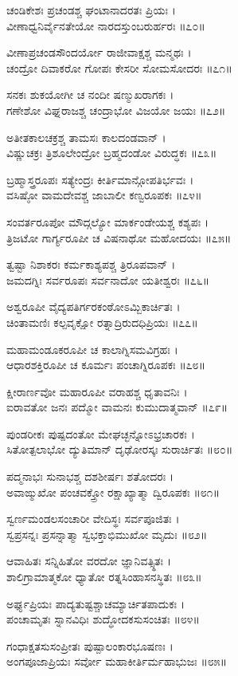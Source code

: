 ಚಂಡಿಕೇಶಃ ಪ್ರಚಂಡಶ್ಚ ಘಂಟಾನಾದರತಃ ಪ್ರಿಯಃ ।\\
ವೀಣಾಧ್ವನಿರ್ವೈನತೇಯೋ ನಾರದಸ್ತುಂಬರುರ್ಹರಃ ॥೭೦॥

ವೀಣಾಪ್ರಚಂಡಸೌಂದರ್ಯೋ ರಾಜೀವಾಕ್ಷಶ್ಚ ಮನ್ಮಥಃ ।\\
ಚಂದ್ರೋ ದಿವಾಕರೋ ಗೋಪಃ ಕೇಸರೀ ಸೋಮಸೋದರಃ ॥೭೧॥

ಸನಕಃ ಶುಕಯೋಗೀ ಚ ನಂದೀ ಷಣ್ಮುಖರಾಗಕಃ ।\\
ಗಣೇಶೋ ವಿಘ್ನರಾಜಶ್ಚ ಚಂದ್ರಾಭೋ ವಿಜಯೋ ಜಯಃ ॥೭೨॥

ಅತೀತಕಾಲಚಕ್ರಶ್ಚ ತಾಮಸಃ ಕಾಲದಂಡವಾನ್ ।\\
ವಿಷ್ಣುಚಕ್ರಃ ತ್ರಿಶೂಲೇಂದ್ರೋ ಬ್ರಹ್ಮದಂಡೋ ವಿರುದ್ಧಕಃ ॥೭೩॥

ಬ್ರಹ್ಮಾಸ್ತ್ರರೂಪಃ ಸತ್ಯೇಂದ್ರಃ ಕೀರ್ತಿಮಾನ್ಗೋಪತಿರ್ಭವಃ ।\\
ವಸಿಷ್ಠೋ ವಾಮದೇವಶ್ಚ ಜಾಬಾಲೀ ಕಣ್ವರೂಪಕಃ ॥೭೪॥

ಸಂವರ್ತರೂಪೋ ಮೌದ್ಗಲ್ಯೋ ಮಾರ್ಕಂಡೇಯಶ್ಚ ಕಶ್ಯಪಃ ।\\
ತ್ರಿಜಟೋ ಗಾರ್ಗ್ಯರೂಪೀ ಚ ವಿಷನಾಥೋ ಮಹೋದಯಃ ॥೭೫॥

ತ್ವಷ್ಟಾ ನಿಶಾಕರಃ ಕರ್ಮಕಾಶ್ಯಪಶ್ಚ ತ್ರಿರೂಪವಾನ್ ।\\
ಜಮದಗ್ನಿಃ ಸರ್ವರೂಪಃ ಸರ್ವನಾದೋ ಯತೀಶ್ವರಃ ॥೭೬॥

ಅಶ್ವರೂಪೀ ವೈದ್ಯಪತಿರ್ಗರಕಂಠೋಽಮ್ಬಿಕಾರ್ಚಿತಃ ।\\
ಚಿಂತಾಮಣಿಃ ಕಲ್ಪವೃಕ್ಷೋ ರತ್ನಾದ್ರಿರುದಧಿಪ್ರಿಯಃ ॥೭೭॥

ಮಹಾಮಂಡೂಕರೂಪೀ ಚ ಕಾಲಾಗ್ನಿಸಮವಿಗ್ರಹಃ ।\\
ಆಧಾರಶಕ್ತಿರೂಪೀ ಚ ಕೂರ್ಮಃ ಪಂಚಾಗ್ನಿರೂಪಕಃ ॥೭೮॥

ಕ್ಷೀರಾರ್ಣವೋ ಮಹಾರೂಪೀ ವರಾಹಶ್ಚ ಧೃತಾವನಿಃ ।\\
ಐರಾವತೋ ಜನಃ ಪದ್ಮೋ ವಾಮನಃ ಕುಮುದಾತ್ಮವಾನ್ ॥೭೯॥

ಪುಂಡರೀಕಃ ಪುಷ್ಪದಂತೋ ಮೇಘಚ್ಛನ್ನೋಽಭ್ರಚಾರಕಃ ।\\
ಸಿತೋತ್ಪಲಾಭೋ ದ್ಯುತಿಮಾನ್ ದೃಢೋರಸ್ಕಃ ಸುರಾರ್ಚಿತಃ ॥೮೦॥

ಪದ್ಮನಾಭಃ ಸುನಾಭಶ್ಚ ದಶಶೀರ್ಷಃ ಶತೋದರಃ ।\\
ಅವಾಙ್ಮುಖೋ ಪಂಚವಕ್ತ್ರೋ ರಕ್ಷಾಖ್ಯಾತ್ಮಾ ದ್ವಿರೂಪಕಃ ॥೮೧॥

ಸ್ವರ್ಣಮಂಡಲಸಂಚಾರೀ ವೇದಿಸ್ಥಃ ಸರ್ವಪೂಜಿತಃ ।\\
ಸ್ವಪ್ರಸನ್ನಃ ಪ್ರಸನ್ನಾತ್ಮಾ ಸ್ವಭಕ್ತಾಭಿಮುಖೋ ಮೃದುಃ ॥೮೨॥

ಆವಾಹಿತಃ ಸನ್ನಿಹಿತೋ ವರದೋ ಜ್ಞಾನಿವತ್ಸ್ಥಿತಃ ।\\
ಶಾಲಿಗ್ರಾಮಾತ್ಮಕೋ ಧ್ಯಾತೋ ರತ್ನಸಿಂಹಾಸನಸ್ಥಿತಃ ॥೮೩॥

ಅರ್ಘ್ಯಪ್ರಿಯಃ ಪಾದ್ಯತುಷ್ಟಶ್ಚಾಚಮ್ಯಾರ್ಚಿತಪಾದುಕಃ ।\\
ಪಂಚಾಮೃತಃ ಸ್ನಾನವಿಧಿಃ ಶುದ್ಧೋದಕಸುಸಂಚಿತಃ ॥೮೪॥

ಗಂಧಾಕ್ಷತಸುಸಂಪ್ರೀತಃ ಪುಷ್ಪಾಲಂಕಾರಭೂಷಣಃ ।\\
ಅಂಗಪೂಜಾಪ್ರಿಯಃ ಸರ್ವೋ ಮಹಾಕೀರ್ತಿರ್ಮಹಾಭುಜಃ ॥೮೫॥

